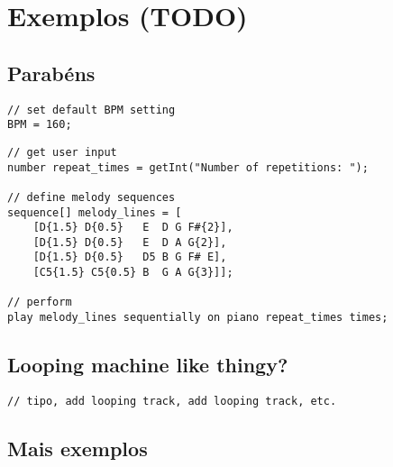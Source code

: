 \documentclass{article}
\begin{document}
\clearpage

\section{Exemplos (TODO)} \label{example}
\subsection{Parabéns}
\begin{lstlisting}[caption=parabens.auxiliar]
// set default BPM setting
BPM = 160;
\end{lstlisting}

\begin{lstlisting}[caption=parabens.principal]
// get user input
number repeat_times = getInt("Number of repetitions: ");

// define melody sequences
sequence[] melody_lines = [
    [D{1.5} D{0.5}   E  D G F#{2}], 
    [D{1.5} D{0.5}   E  D A G{2}],
    [D{1.5} D{0.5}   D5 B G F# E],
    [C5{1.5} C5{0.5} B  G A G{3}]];

// perform
play melody_lines sequentially on piano repeat_times times;
\end{lstlisting}

\subsection{Looping machine like thingy?}
\begin{lstlisting} 
// tipo, add looping track, add looping track, etc.
\end{lstlisting}

\subsection{Mais exemplos}
\begin{lstlisting} 
\end{lstlisting}

% 
% 
\end{document}
